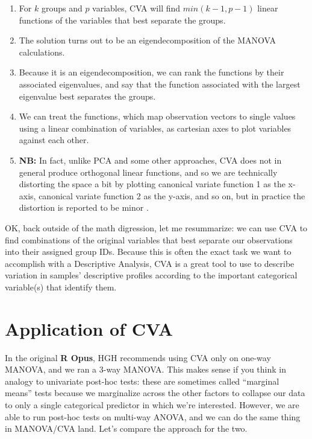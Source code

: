 \documentclass[
]{book}
\providecommand{\tightlist}{%
  \setlength{\itemsep}{0pt}\setlength{\parskip}{0pt}}
\begin{document}
\begin{enumerate}
\def\labelenumi{\arabic{enumi}.}
\tightlist
\item
  For \(k\) groups and \(p\) variables, CVA will find \(min(k-1, p-1)\) linear functions of the variables that best separate the groups.\\
\item
  The solution turns out to be an eigendecomposition of the MANOVA calculations.
\item
  Because it is an eigendecomposition, we can rank the functions by their associated eigenvalues, and say that the function associated with the largest eigenvalue best separates the groups.
\item
  We can treat the functions, which map observation vectors to single values using a linear combination of variables, as cartesian axes to plot variables against each other.
\item
  \textbf{NB:} In fact, unlike PCA and some other approaches, CVA does not in general produce orthogonal linear functions, and so we are technically distorting the space a bit by plotting canonical variate function 1 as the x-axis, canonical variate function 2 as the y-axis, and so on, but in practice the distortion is reported to be minor \citep[\citet{heymannSensory2017}]{rencherMethods2002}.
\end{enumerate}

OK, back outside of the math digression, let me resummarize: we can use CVA to find combinations of the original variables that best separate our observations into their assigned group IDs. Because this is often the exact task we want to accomplish with a Descriptive Analysis, CVA is a great tool to use to describe variation in samples' descriptive profiles according to the important categorical variable(s) that identify them.

\section{Application of CVA}\label{application-of-cva}

In the original \textbf{R Opus}, HGH recommends using CVA only on one-way MANOVA, and we ran a 3-way MANOVA. This makes sense if you think in analogy to univariate post-hoc tests: these are sometimes called ``marginal means'' tests because we marginalize across the other factors to collapse our data to only a single categorical predictor in which we're interested. However, we are able to run post-hoc tests on multi-way ANOVA, and we can do the same thing in MANOVA/CVA land. Let's compare the approach for the two.
\end{document}
